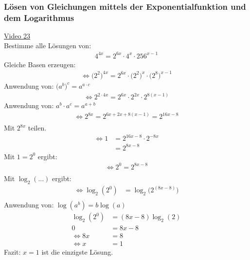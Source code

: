 \subsubsection{ Lösen von Gleichungen mittels der Exponentialfunktion und dem Logarithmus}
\href{https://youtu.be/w04eRCcWpHU}{Video 23}\\
Bestimme alle Lösungen von:\\
\begin{align*}
4^{4x}=2^{6x}\cdot 4^x\cdot 256^{x-1}
\end{align*}
Gleiche Basen erzeugen:\\
\begin{align*}
\Leftrightarrow \big(2^2\big)^{4x}=2^{6x}\cdot \big(2^2\big)^{x}\cdot\big(2^8\big)^{x-1}
\end{align*}
Anwendung von: $ \big(a^b\big)^c=a^{a\cdot c} $\\
\begin{align*}
\Leftrightarrow  2^{2\cdot 4x}=2^{6x}\cdot 2^{2x}\cdot 2^{8(x-1)}
\end{align*}
Anwendung von: $ a^b\cdot a^c=a^{a+b} $\\
\begin{align*}
\Leftrightarrow 2^{8x}=2^{6x+2x+8(x-1)}=2^{16x-8}\\
\end{align*}
Mit $ 2^{8x} $ teilen.\\
\begin{align*}
\Leftrightarrow 1&=2^{16x-8}\cdot 2^{-8x}\\
&=2^{8x-8}
\end{align*}
Mit $ 1=2^0 $ ergibt:\\
\begin{align*}
\Leftrightarrow2^0=2^{8x-8}\\
\end{align*}
Mit $ \log_2(...) $ ergibt:\\
\begin{align*}
\Leftrightarrow \log_2(2^0)&=\log_2\big(2^{(8x-8)}\big)\\
\end{align*}
Anwendung von: $ \log(a^b)=b\log(a) $
\begin{align*}
\log_2(2^0)&=(8x-8)\log_2(2)\\
0&=8x-8\\
\Leftrightarrow 8x&=8\\
\Leftrightarrow x&=1
\end{align*}
Fazit: $ x=1 $ ist die einzigste Lösung.\\